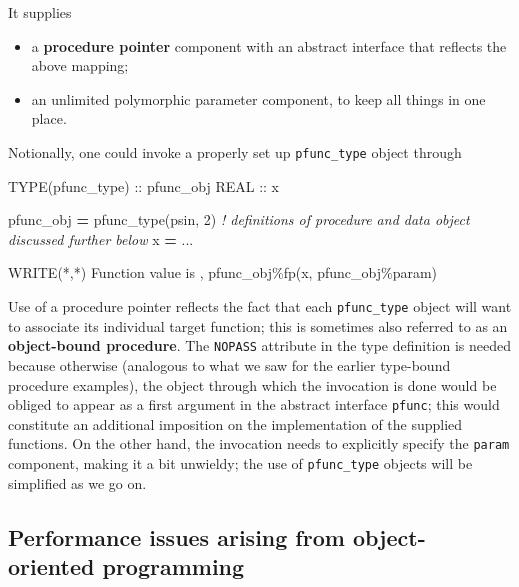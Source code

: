 \documentclass[
]{article}
\newenvironment{Shaded}{}{}
\newcommand{\CommentTok}[1]{\textcolor[rgb]{0.38,0.63,0.69}{\textit{#1}}}
\newcommand{\DataTypeTok}[1]{\textcolor[rgb]{0.56,0.13,0.00}{#1}}
\newcommand{\DecValTok}[1]{\textcolor[rgb]{0.25,0.63,0.44}{#1}}
\newcommand{\FunctionTok}[1]{\textcolor[rgb]{0.02,0.16,0.49}{#1}}
\newcommand{\KeywordTok}[1]{\textcolor[rgb]{0.00,0.44,0.13}{\textbf{#1}}}
\newcommand{\NormalTok}[1]{#1}
\newcommand{\OperatorTok}[1]{\textcolor[rgb]{0.40,0.40,0.40}{#1}}
\newcommand{\StringTok}[1]{\textcolor[rgb]{0.25,0.44,0.63}{#1}}
\providecommand{\tightlist}{%
  \setlength{\itemsep}{0pt}\setlength{\parskip}{0pt}}
\begin{document}
It supplies

\begin{itemize}
\tightlist
\item
  a \textbf{procedure pointer} component with an abstract interface that
  reflects the above mapping;
\item
  an unlimited polymorphic parameter component, to keep all things in
  one place.
\end{itemize}

Notionally, one could invoke a properly set up \texttt{pfunc\_type}
object through

\begin{Shaded}
\begin{Highlighting}[]
\DataTypeTok{TYPE(pfunc\_type)} \DataTypeTok{::}\NormalTok{ pfunc\_obj}
\DataTypeTok{REAL} \DataTypeTok{::}\NormalTok{ x}

\NormalTok{pfunc\_obj }\KeywordTok{=}\NormalTok{ pfunc\_type(psin, }\DecValTok{2}\NormalTok{)}
\CommentTok{! definitions of procedure and data object discussed further below}
\NormalTok{x }\KeywordTok{=}\NormalTok{ ...}

\FunctionTok{WRITE(*}\NormalTok{,}\FunctionTok{*)} \StringTok{\textquotesingle{}Function value is \textquotesingle{}}\NormalTok{, pfunc\_obj}\OperatorTok{\%}\NormalTok{fp(x, pfunc\_obj}\OperatorTok{\%}\NormalTok{param)}
\end{Highlighting}
\end{Shaded}

Use of a procedure pointer reflects the fact that each
\texttt{pfunc\_type} object will want to associate its individual target
function; this is sometimes also referred to as an \textbf{object-bound
procedure}. The \texttt{NOPASS} attribute in the type definition is
needed because otherwise (analogous to what we saw for the earlier
type-bound procedure examples), the object through which the invocation
is done would be obliged to appear as a first argument in the abstract
interface \texttt{pfunc}; this would constitute an additional imposition
on the implementation of the supplied functions. On the other hand, the
invocation needs to explicitly specify the \texttt{param} component,
making it a bit unwieldy; the use of \texttt{pfunc\_type} objects will
be simplified as we go on.

\subsection{Performance issues arising from object-oriented
programming}\label{performance-issues-arising-from-object-oriented-programming}
\end{document}
